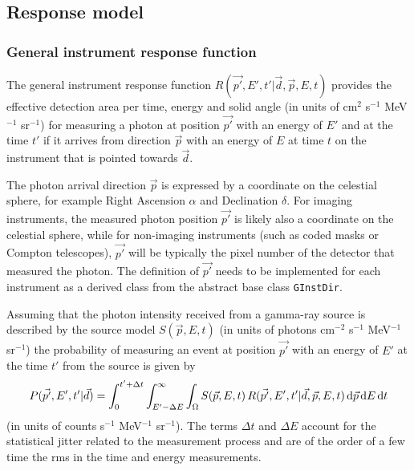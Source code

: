 \documentclass{article}[12pt,a4]
\begin{document}
\subsection{Response model}

\subsubsection{General instrument response function}

The general instrument response function
$R(\vec{p'}, E', t' | \vec{d}, \vec{p}, E, t)$
provides the effective detection area per time, energy and solid angle
(in units of cm$^2$ s$^{-1}$ MeV$^{-1}$ sr$^{-1}$) 
for measuring a photon at position $\vec{p'}$ with an energy of $E'$ and at the time $t'$ if it 
arrives from direction $\vec{p}$ with an energy of $E$ at time $t$ on the instrument that is
pointed towards $\vec{d}$.

The photon arrival direction $\vec{p}$ is expressed by a coordinate on the celestial
sphere, for example Right Ascension $\alpha$ and Declination $\delta$.
For imaging instruments, the measured photon position $\vec{p'}$ is likely also a
coordinate on the celestial sphere, while for non-imaging instruments (such as coded 
masks or Compton telescopes), $\vec{p'}$ will be typically the pixel number of the detector
that measured the photon.
The definition of $\vec{p'}$ needs to be implemented for each instrument as a derived
class from the abstract base class {\tt GInstDir}.

Assuming that the photon intensity received from a gamma-ray source is described by
the source model $S(\vec{p}, E, t)$ (in units of photons cm$^{-2}$ s$^{-1}$ MeV$^{-1}$ sr$^{-1}$)
the probability of measuring an event at position $\vec{p'}$ with an
energy of $E'$ at the time $t'$ from the source is given by
\begin{equation}
P(\vec{p'}, E', t'| \vec{d}) = \int_{0}^{t'+\Delta t} \int_{E'-\Delta E}^{\infty} \int_{\Omega} 
  S(\vec{p}, E, t) \, R(\vec{p'}, E', t' | \vec{d}, \vec{p}, E, t) \, {\rm d}\vec{p} \, {\rm d}E \,{\rm d}t
\label{eq:model}
\end{equation}
(in units of counts s$^{-1}$ MeV$^{-1}$ sr$^{-1}$).
The terms $\Delta t$ and $\Delta E$ account for the statistical jitter related to the measurement
process and are of the order of a few time the rms in the time and energy measurements.
\end{document}
